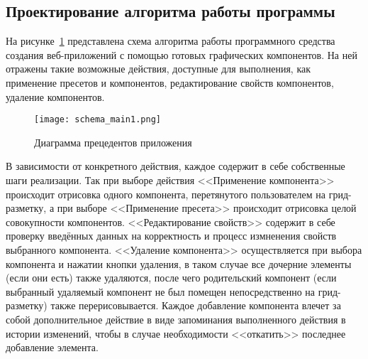 \subsection{Проектирование алгоритма работы программы}
\label{sec:design:algorithm}

На рисунке~\ref{sec:design:main_algorithm_scheme} представлена схема алгоритма работы программного средства создания веб-приложений с помощью готовых графических компонентов. 
На ней отражены такие возможные действия, доступные для выполнения, как применение пресетов и компонентов, редактирование свойств компонентов, удаление компонентов. 

\begin{figure}[ht]
\centering
    \texttt{[image: schema\_main1.png]}
    \caption{Диаграмма прецедентов приложения}
    \label{sec:design:main_algorithm_scheme}
\end{figure}
    
В зависимости от конкретного действия, каждое содержит в себе собственные шаги реализации. 
Так при выборе действия <<Применение компонента>> происходит отрисовка одного компонента, перетянутого пользователем на грид-разметку, а при выборе <<Применение пресета>> происходит отрисовка целой совокупности компонентов. <<Редактирование свойств>> содержит в себе проверку введённых данных на корректность и процесс измненения свойств выбранного компонента. <<Удаление компонента>> осуществляется при выбора компонента и нажатии кнопки удаления, в таком случае все дочерние элементы (если они есть) также удаляются, после чего родительский компонент (если выбранный удаляемый компонент не был помещен непосредственно на грид-разметку) также перерисовывается. Каждое добавление компонента влечет за собой дополнительное действие в виде запоминания выполненного действия в истории изменений, чтобы в случае необходимости <<откатить>> последнее добавление элемента.

